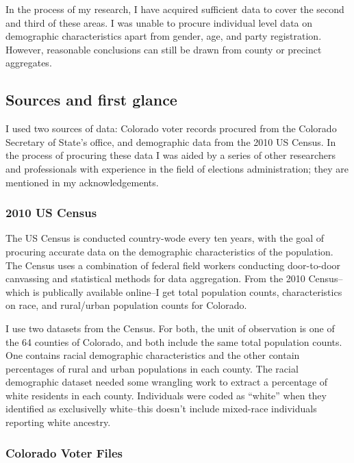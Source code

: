 \documentclass[12pt,twoside]{reedthesis}
\begin{document}
  In the process of my research, I have acquired sufficient data to cover
  the second and third of these areas. I was unable to procure individual
  level data on demographic characteristics apart from gender, age, and
  party registration. However, reasonable conclusions can still be drawn
  from county or precinct aggregates.
  
  \subsection{Sources and first glance}\label{sources-and-first-glance}
  
  I used two sources of data: Colorado voter records procured from the
  Colorado Secretary of State's office, and demographic data from the 2010
  US Census. In the process of procuring these data I was aided by a
  series of other researchers and professionals with experience in the
  field of elections administration; they are mentioned in my
  acknowledgements.
  
  \subsubsection{2010 US Census}\label{us-census}
  
  The US Census is conducted country-wode every ten years, with the goal
  of procuring accurate data on the demographic characteristics of the
  population. The Census uses a combination of federal field workers
  conducting door-to-door canvassing and statistical methods for data
  aggregation. From the 2010 Census--which is publically available
  online--I get total population counts, characteristics on race, and
  rural/urban population counts for Colorado.
  
  I use two datasets from the Census. For both, the unit of observation is
  one of the 64 counties of Colorado, and both include the same total
  population counts. One contains racial demographic characteristics and
  the other contain percentages of rural and urban populations in each
  county. The racial demographic dataset needed some wrangling work to
  extract a percentage of white residents in each county. Individuals were
  coded as ``white'' when they identified as exclusivelly white--this
  doesn't include mixed-race individuals reporting white ancestry.
  
  \subsubsection{Colorado Voter Files}\label{colorado-voter-files}
  
\end{document}
